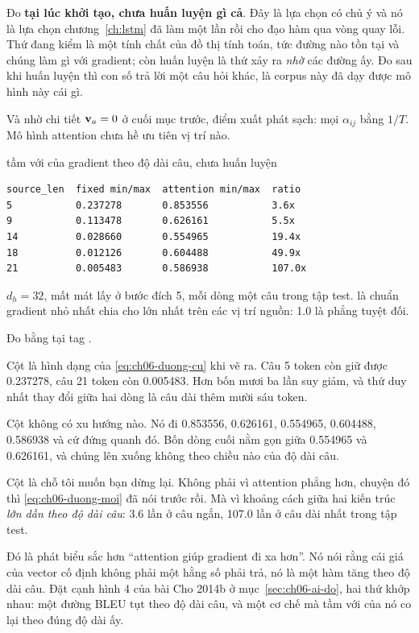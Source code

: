 %
Đo \textbf{tại lúc khởi tạo, chưa huấn luyện gì cả}. Đây là lựa chọn có chủ ý
và nó là lựa chọn chương~\ref{ch:lstm} đã làm một lần rồi cho đạo hàm qua
vòng quay lỗi. Thứ đang kiểm là một tính chất của đồ thị tính toán, tức đường
nào tồn tại và chúng làm gì với gradient; còn huấn luyện là thứ xảy ra
\emph{nhờ} các đường ấy. Đo sau khi huấn luyện thì con số trả lời một câu hỏi
khác, là corpus này đã dạy được mô hình này cái gì.

Và nhờ chi tiết \(\mathbf{v}_a = 0\) ở cuối mục trước, điểm xuất phát sạch: mọi
\(\alpha_{ij}\) bằng \(1/T\). Mô hình attention chưa hề ưu tiên vị trí nào.

\begin{measured}{tầm với của gradient theo độ dài câu, chưa huấn luyện}
\begin{verbatim}
source_len  fixed min/max  attention min/max  ratio
5           0.237278       0.853556           3.6x
9           0.113478       0.626161           5.5x
14          0.028660       0.554965           19.4x
18          0.012126       0.604488           49.9x
21          0.005483       0.586938           107.0x
\end{verbatim}

\(d_h = 32\), mất mát lấy ở bước đích 5, mỗi dòng một câu trong tập test.
 là chuẩn gradient nhỏ nhất chia cho lớn nhất trên các vị trí
nguồn: 1.0 là phẳng tuyệt đối.

Đo bằng  tại tag .
\end{measured}

Cột  là hình dạng của \eqref{eq:ch06-duong-cu} khi vẽ ra. Câu 5
token còn giữ được 0.237278, câu 21 token còn 0.005483. Hơn bốn mươi ba lần
suy giảm, và thứ duy nhất thay đổi giữa hai dòng là câu dài thêm mười sáu
token.

Cột  không có xu hướng nào. Nó đi 0.853556, 0.626161, 0.554965,
0.604488, 0.586938 và cứ đứng quanh đó. Bốn dòng cuối nằm gọn giữa 0.554965 và
0.626161, và chúng lên xuống không theo chiều nào của độ dài câu.

%
Cột  là chỗ tôi muốn bạn dừng lại. Không phải vì attention phẳng
hơn, chuyện đó thì \eqref{eq:ch06-duong-moi} đã nói trước rồi. Mà vì khoảng
cách giữa hai kiến trúc \emph{lớn dần theo độ dài câu}: 3.6 lần ở câu ngắn,
107.0 lần ở câu dài nhất trong tập test.

Đó là phát biểu sắc hơn \enquote{attention giúp gradient đi xa hơn}. Nó nói
rằng cái giá của vector cố định không phải một hằng số phải trả, nó là một hàm
tăng theo độ dài câu. Đặt cạnh hình 4 của bài Cho 2014b ở mục~\ref{sec:ch06-ai-do},
hai thứ khớp nhau: một đường BLEU tụt theo độ dài câu, và một cơ chế mà tầm với
của nó co lại theo đúng độ dài ấy.

